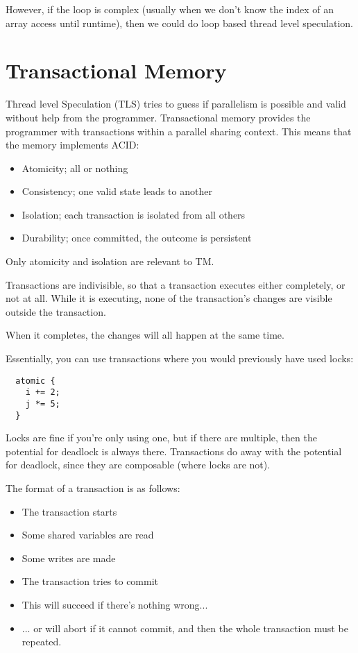 However, if the loop is complex (usually when we don't know the index
of an array access until runtime), then we could do loop based thread
level speculation.



\section{Transactional Memory}

Thread level Speculation (TLS) tries to guess if parallelism is
possible and valid without help from the programmer. Transactional
memory provides the programmer with transactions within a parallel
sharing context. This means that the memory implements ACID:

\begin{itemize}
\item Atomicity; all or nothing
\item Consistency; one valid state leads to another
\item Isolation; each transaction is isolated from all others 
\item Durability; once committed, the outcome is persistent
\end{itemize}

Only atomicity and isolation are relevant to TM.

Transactions are indivisible, so that a transaction executes either
completely, or not at all. While it is executing, none of the
transaction's changes are visible outside the transaction.

When it completes, the changes will all happen at the same time.

Essentially, you can use transactions where you would previously have
used locks:

\begin{verbatim}
  atomic {
    i += 2;
    j *= 5;
  }
\end{verbatim}

Locks are fine if you're only using one, but if there are multiple,
then the potential for deadlock is always there. Transactions do away
with the potential for deadlock, since they are composable (where
locks are not).

The format of a transaction is as follows:

\begin{itemize}
\item The transaction starts
\item Some shared variables are read
\item Some writes are made
\item The transaction tries to commit
\item This will succeed if there's nothing wrong...
\item ... or will abort if it cannot commit, and then the whole transaction must be repeated.
\end{itemize}

